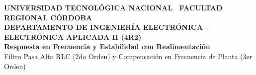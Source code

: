 \documentclass[aspectratio=169, 10pt]{beamer}
\begin{document}

\begin{frame}[plain]
  \vspace{0.2cm}
  \begin{tarjeta}[colframe=NavyDark, boxrule=1.2pt, top=10pt, bottom=10pt, left=12pt, right=12pt]
    {\fontsize{8.5pt}{10pt}\selectfont \textbf{\color{CyanDark} UNIVERSIDAD TECNOLÓGICA NACIONAL \textbar\ FACULTAD REGIONAL CÓRDOBA}}\\[1pt]
    {\fontsize{7.5pt}{9pt}\selectfont \textbf{\color{SlateMuted} DEPARTAMENTO DE INGENIERÍA ELECTRÓNICA -- ELECTRÓNICA APLICADA II (4R2)}}\\[7pt]

    {\fontsize{13pt}{16pt}\selectfont \textbf{\color{NavyDark} Respuesta en Frecuencia y Estabilidad con Realimentación}}\\[3.5pt]
    {\fontsize{9.5pt}{12pt}\selectfont \color{BlueAccent} Filtro Pasa Alto RLC (2do Orden) y Compensación en Frecuencia de Planta (3er Orden)}\\[14pt]


\end{tarjeta}
\end{frame}
\end{document}
